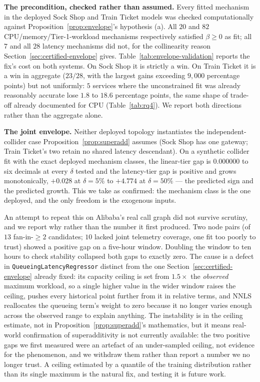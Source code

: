 \documentclass[journal, 10pt]{IEEEtran}
\begin{document}
\textbf{The precondition, checked rather than assumed.} Every fitted mechanism
in the deployed Sock Shop and Train Ticket models was checked computationally
against Proposition~\ref{prop:envelope}'s hypothesis (a). All $20$ and $82$
CPU/memory/Tier-1-workload mechanisms respectively satisfied $\beta\geq0$ as
fit; all $7$ and all $28$ latency mechanisms did not, for the collinearity
reason Section~\ref{sec:certified-envelope} gives. Table~\ref{tab:envelope-validation}
reports the fix's cost on both systems. On Sock Shop it is strictly a win.
On Train Ticket it is a win in aggregate ($23/28$, with the largest gains
exceeding $9{,}000$ percentage points) but not uniformly: $5$ services where
the unconstrained fit was already reasonably accurate lose $1.8$ to $18.6$
percentage points, the same shape of trade-off already documented for CPU
(Table~\ref{tab:rq4}). We report both directions rather than the aggregate
alone.

\textbf{The joint envelope.} Neither deployed topology instantiates the
independent-collider case Proposition~\ref{prop:superadd} assumes (Sock Shop
has one gateway; Train Ticket's two retain no shared latency descendant). On a
synthetic collider fit with the exact deployed mechanism classes, the
linear-tier gap is $0.000000$ to six decimals at every $\delta$ tested and the
latency-tier gap is positive and grows monotonically, $+0.028$ at $\delta{=}5\%$
to $+4.774$ at $\delta{=}50\%$ --- the predicted sign and the predicted growth.
This we take as confirmed: the mechanism class is the one deployed, and the
only freedom is the exogenous inputs.

An attempt to repeat this on Alibaba's real call graph did not survive scrutiny,
and we report why rather than the number it first produced. Two node pairs
(of $13$ fan-in-$\geq2$ candidates; $10$ lacked joint telemetry coverage, one
fit too poorly to trust) showed a positive gap on a five-hour window. Doubling
the window to ten hours to check stability collapsed both gaps to exactly zero.
The cause is a defect in \texttt{QueueingLatencyRegressor} distinct from the
one Section~\ref{sec:certified-envelope} already fixed: its capacity ceiling is
set from $1.5\times$ the \emph{observed} maximum workload, so a single higher
value in the wider window raises the ceiling, pushes every historical point
further from it in relative terms, and NNLS reallocates the queueing term's
weight to zero because it no longer varies enough across the observed range to
explain anything. The instability is in the ceiling estimate, not in
Proposition~\ref{prop:superadd}'s mathematics, but it means real-world
confirmation of superadditivity is not currently available: the two positive
gaps we first measured were an artefact of an under-sampled ceiling, not
evidence for the phenomenon, and we withdraw them rather than report a number
we no longer trust. A ceiling estimated by a quantile of the training
distribution rather than its single maximum is the natural fix, and testing
it is future work.
\end{document}
